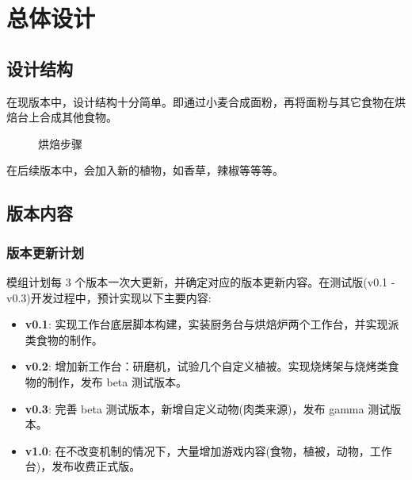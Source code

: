 \section{总体设计}

\subsection{设计结构}

在现版本中，设计结构十分简单。即通过小麦合成面粉，再将面粉与其它食物在烘焙台上合成其他食物。

\begin{figure}[H]
    \centering
    \caption{烘焙步骤}
\end{figure}

在后续版本中，会加入新的植物，如香草，辣椒等等等。

\subsection{版本内容}
\subsubsection{版本更新计划}

模组计划每 3 个版本一次大更新，并确定对应的版本更新内容。在测试版(v0.1 - v0.3)开发过程中，预计实现以下主要内容:
\begin{itemize}
    \item \textbf{v0.1}: 实现工作台底层脚本构建，实装厨务台与烘焙炉两个工作台，并实现派类食物的制作。
    \item \textbf{v0.2}: 增加新工作台：研磨机，试验几个自定义植被。实现烧烤架与烧烤类食物的制作，发布 beta 测试版本。
    \item \textbf{v0.3}: 完善 beta 测试版本，新增自定义动物(肉类来源)，发布 gamma 测试版本。
    \item \textbf{v1.0}: 在不改变机制的情况下，大量增加游戏内容(食物，植被，动物，工作台)，发布收费正式版。
\end{itemize}

